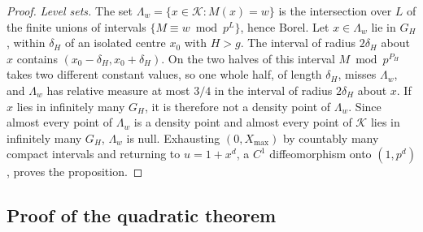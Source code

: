 \documentclass[11pt]{article}
\begin{document}
\begin{proof}
\emph{Level sets.} The set $\Lambda_w=\{x\in\mathcal K:M(x)=w\}$ is the intersection over $L$ of the
finite unions of intervals $\{M\equiv w\bmod p^L\}$, hence Borel. Let $x\in\Lambda_w$ lie in $G_H$, within
$\delta_H$ of an isolated centre $x_0$ with $H>g$. The interval of radius $2\delta_H$ about $x$ contains
$(x_0-\delta_H,x_0+\delta_H)$. On the two halves of this interval $M\bmod p^{P_H}$ takes two different
constant values, so one whole half, of length $\delta_H$, misses $\Lambda_w$, and $\Lambda_w$ has relative
measure at most $3/4$ in the interval of radius $2\delta_H$ about $x$. If $x$ lies in infinitely many
$G_H$, it is therefore not a density point of $\Lambda_w$. Since almost every point of $\Lambda_w$ is a
density point and almost every point of $\mathcal K$ lies in infinitely many $G_H$, $\Lambda_w$ is null.
Exhausting $(0,X_{\max})$ by countably many compact intervals and returning to $u=1+x^d$, a $C^1$
diffeomorphism onto $(1,p^d)$, proves the proposition.
\end{proof}

\subsection{Proof of the quadratic theorem}\label{sec:quad-proof}
\end{document}
